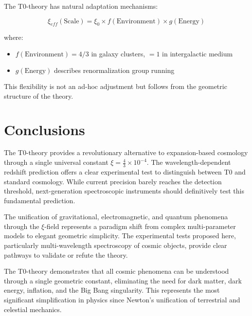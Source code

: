 \documentclass[12pt,a4paper]{article}
\newcommand{\xiconst}{\xi = \frac{4}{3} \times 10^{-4}}
\theoremstyle{definition}
\begin{document}
	The T0-theory has natural adaptation mechanisms:
	
	\begin{equation}
		\xi_{eff}(\text{Scale}) = \xi_0 \times f(\text{Environment}) \times g(\text{Energy})
	\end{equation}
	
	where:
	\begin{itemize}
		\item $f(\text{Environment}) = 4/3$ in galaxy clusters, $= 1$ in intergalactic medium
		\item $g(\text{Energy})$ describes renormalization group running
	\end{itemize}
	
	This flexibility is not an ad-hoc adjustment but follows from the geometric structure of the theory.
	
	\section{Conclusions}
	
	The T0-theory provides a revolutionary alternative to expansion-based cosmology through a single universal constant $\xiconst$. The wavelength-dependent redshift prediction offers a clear experimental test to distinguish between T0 and standard cosmology. While current precision barely reaches the detection threshold, next-generation spectroscopic instruments should definitively test this fundamental prediction.
	
	The unification of gravitational, electromagnetic, and quantum phenomena through the $\xi$-field represents a paradigm shift from complex multi-parameter models to elegant geometric simplicity. The experimental tests proposed here, particularly multi-wavelength spectroscopy of cosmic objects, provide clear pathways to validate or refute the theory.
	
	\begin{important}[title=Final Perspective]
		The T0-theory demonstrates that all cosmic phenomena can be understood through a single geometric constant, eliminating the need for dark matter, dark energy, inflation, and the Big Bang singularity. This represents the most significant simplification in physics since Newton's unification of terrestrial and celestial mechanics.
	\end{important}
	
\end{document}
